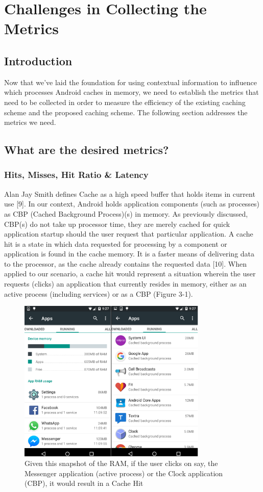 \documentclass[12pt]{uthesis-v12}  %
\begin{document}
\chapter{Challenges in Collecting the Metrics}
	
	\section{Introduction}
		Now that we've laid the foundation for using contextual information to influence which processes Android caches in memory, we need to establish the metrics that need to be collected in order to measure the efficiency of the existing caching scheme and the proposed caching scheme. The following section addresses the metrics we need.
	
	\section{What are the desired metrics?}
		
		\subsection{Hits, Misses, Hit Ratio \& Latency}
			Alan Jay Smith defines Cache as a high speed buffer that holds items in current use [9]. In our context, Android holds application components (such as processes) as CBP (Cached Background Process)(s) in memory. As previously discussed, CBP(s) do not take up processor time, they are merely cached for quick application startup should the user request that particular application. A cache hit is a state in which data requested for processing by a component or application is found in the cache memory. It is a faster means of delivering data to the processor, as the cache already contains the requested data [10]. When applied to our scenario, a cache hit would represent a situation wherein the user requests (clicks) an application that currently resides in memory, either as an active process (including services) or as a CBP (Figure 3-1).  
			
			\begin{figure}[!ht]
				\centering
				\includegraphics[width = 90mm]{images/runningApps.png}
				\caption[Running Apps and CBP(s) - Cache Hit]
				{Given this snapshot of the RAM, if the user clicks on say, the Messenger application (active process) or the Clock application (CBP), it would result in a Cache Hit}
			\end{figure}
			
\end{document}
